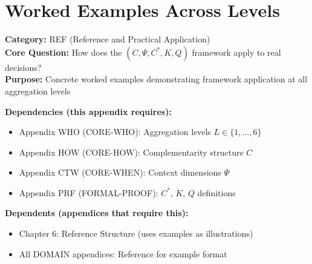 \section{Worked Examples Across Levels}
\label{app:examples}


\begin{tcolorbox}[colback=gray!5!white, colframe=gray!75!black,
    title=\textbf{Appendix: F REF-EXAMPLES}]

\textbf{Category:} REF (Reference and Practical Application) \\
\textbf{Core Question:} How does the $(C, \Psi, C^*, K, Q)$ framework apply to real decisions? \\
\textbf{Purpose:} Concrete worked examples demonstrating framework application at all aggregation levels

\end{tcolorbox}


\begin{tcolorbox}[colback=yellow!5!white, colframe=yellow!75!black,
    title=\textbf{Cross-Reference Map}]

\textbf{Dependencies (this appendix requires):}
\begin{itemize}[nosep]
    \item Appendix WHO (CORE-WHO): Aggregation levels $L \in \{1,...,6\}$
    \item Appendix HOW (CORE-HOW): Complementarity structure $C$
    \item Appendix CTW (CORE-WHEN): Context dimensions $\Psi$
    \item Appendix PRF (FORMAL-PROOF): $C^*$, $K$, $Q$ definitions
\end{itemize}

\textbf{Dependents (appendices that require this):}
\begin{itemize}[nosep]
    \item Chapter 6: Reference Structure (uses examples as illustrations)
    \item All DOMAIN appendices: Reference for example format
\end{itemize}

\end{tcolorbox}

